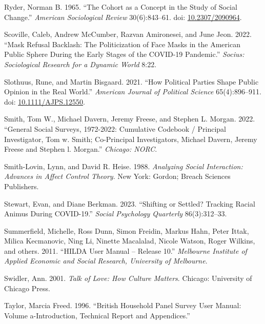 \documentclass[
  11pt,
]{article}
\newlength{\cslhangindent}
\newenvironment{CSLReferences}[2] %
 {\begin{list}{}{%
  \setlength{\itemindent}{0pt}
  \setlength{\leftmargin}{0pt}
  \setlength{\parsep}{0pt}
  \ifodd #1
   \setlength{\leftmargin}{\cslhangindent}
   \setlength{\itemindent}{-1\cslhangindent}
  \fi
  \setlength{\itemsep}{#2\baselineskip}}}
 {\end{list}}
\begin{document}
\begin{CSLReferences}{1}{1}
Ryder, Norman B. 1965. {``The {Cohort} as a {Concept} in the {Study} of
{Social} {Change}.''} \emph{American Sociological Review} 30(6):843--61.
doi: \href{https://doi.org/10.2307/2090964}{10.2307/2090964}.

Scoville, Caleb, Andrew McCumber, Razvan Amironesei, and June Jeon.
2022. {``Mask {Refusal} {Backlash}: {The} {Politicization} of {Face}
{Masks} in the {American} {Public} {Sphere} During the {Early} {Stages}
of the {COVID}-19 {Pandemic}.''} \emph{Socius: Sociological Research for
a Dynamic World} 8:22.

Slothuus, Rune, and Martin Bisgaard. 2021. {``How {Political} {Parties}
{Shape} {Public} {Opinion} in the {Real} {World}.''} \emph{American
Journal of Political Science} 65(4):896--911. doi:
\href{https://doi.org/10.1111/AJPS.12550}{10.1111/AJPS.12550}.

Smith, Tom W., Michael Davern, Jeremy Freese, and Stephen L. Morgan.
2022. {``General Social Surveys, 1972-2022: Cumulative Codebook /
Principal Investigator, Tom w. Smith; Co-Principal Investigators,
Michael Davern, Jeremy Freese and Stephen l. Morgan.''} \emph{Chicago:
NORC}.

Smith-Lovin, Lynn, and David R. Heise. 1988. \emph{Analyzing {Social}
{Interaction}: {Advances} in {Affect} {Control} {Theory}}. New York:
Gordon; Breach Sciences Publishers.

Stewart, Evan, and Diane Berkman. 2023. {``Shifting or Settled? Tracking
Racial Animus During COVID-19.''} \emph{Social Psychology Quarterly}
86(3):312--33.

Summerfield, Michelle, Ross Dunn, Simon Freidin, Markus Hahn, Peter
Ittak, Milica Kecmanovic, Ning Li, Ninette Macalalad, Nicole Watson,
Roger Wilkins, and others. 2011. {``HILDA User Manual -- Release 10.''}
\emph{Melbourne Institute of Applied Economic and Social Research,
University of Melbourne}.

Swidler, Ann. 2001. \emph{Talk of {Love}: {How} {Culture} {Matters}}.
Chicago: University of Chicago Press.

Taylor, Marcia Freed. 1996. {``British Household Panel Survey User
Manual: Volume a-Introduction, Technical Report and Appendices.''}


\end{CSLReferences}
\end{document}
